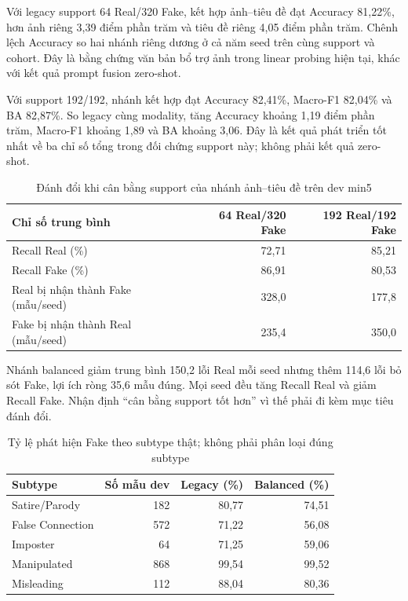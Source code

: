\documentclass[12pt,a4paper]{article}
\newcommand{\BodySize}{13}
\newcommand{\BodyLeading}{15.6}
\newcommand{\BodyFont}{\fontsize{\BodySize}{\BodyLeading}\selectfont}
\numberwithin{figure}{section}
\numberwithin{table}{section}
\numberwithin{equation}{section}
\begin{document}
Với legacy support 64 Real/320 Fake, kết hợp ảnh--tiêu đề đạt Accuracy 81,22\%, hơn ảnh riêng 3,39
điểm phần trăm và tiêu đề riêng 4,05 điểm phần trăm. Chênh lệch Accuracy so hai nhánh riêng dương ở
cả năm seed trên cùng support và cohort. Đây là bằng chứng văn bản bổ trợ ảnh trong linear probing
hiện tại, khác với kết quả prompt fusion zero-shot.

Với support 192/192, nhánh kết hợp đạt Accuracy 82,41\%, Macro-F1 82,04\% và BA 82,87\%. So legacy
cùng modality, tăng Accuracy khoảng 1,19 điểm phần trăm, Macro-F1 khoảng 1,89 và BA khoảng 3,06. Đây
là kết quả phát triển tốt nhất về ba chỉ số tổng trong đối chứng support này; không phải kết quả
zero-shot.

\begin{table}[H]

    \centering
    \BodyFont
\caption{Đánh đổi khi cân bằng support của nhánh ảnh--tiêu đề trên dev min5}
\begin{tabularx}{\linewidth}{@{}L r r@{}}
\toprule
Chỉ số trung bình & 64 Real/320 Fake & 192 Real/192 Fake\\
\midrule
Recall Real (\%) & 72,71 & 85,21\\
Recall Fake (\%) & 86,91 & 80,53\\
Real bị nhận thành Fake (mẫu/seed) & 328,0 & 177,8\\
Fake bị nhận thành Real (mẫu/seed) & 235,4 & 350,0\\
\bottomrule
\end{tabularx}

\end{table}

Nhánh balanced giảm trung bình 150,2 lỗi Real mỗi seed nhưng thêm 114,6 lỗi bỏ sót Fake, lợi ích
ròng 35,6 mẫu đúng. Mọi seed đều tăng Recall Real và giảm Recall Fake. Nhận định ``cân bằng support
tốt hơn'' vì thế phải đi kèm mục tiêu đánh đổi.

\begin{table}[H]

    \centering
    \BodyFont
\caption{Tỷ lệ phát hiện Fake theo subtype thật; không phải phân loại đúng subtype}
\begin{tabularx}{\linewidth}{@{}L r r r@{}}
\toprule
Subtype & Số mẫu dev & Legacy (\%) & Balanced (\%)\\
\midrule
Satire/Parody &182&80,77&74,51\\
False Connection &572&71,22&56,08\\
Imposter &64&71,25&59,06\\
Manipulated &868&99,54&99,52\\
Misleading &112&88,04&80,36\\
\bottomrule
\end{tabularx}

\end{table}
\end{document}
